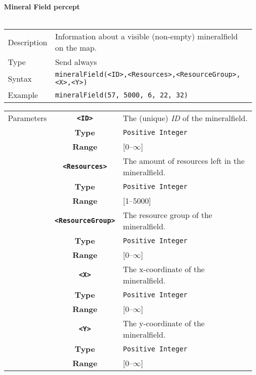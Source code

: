 \newpage
\noindent
\textbf{Mineral Field percept}\\
\\
\begin{tabularx}{\textwidth}{lX}
 Description & Information about a visible (non-empty) mineralfield on the map. \\
 Type & Send always \\
 Syntax & \verb|mineralField(<ID>,<Resources>,<ResourceGroup>,<X>,<Y>)| \\
 Example & \verb|mineralField(57, 5000, 6, 22, 32)| \\
 \end{tabularx}
 \begin{tabularx}{\textwidth}{l | c | p{8cm}|}
 \cline{2-3}
 Parameters & \textbf{\verb|<ID>|} & The (unique) \textit{ID} of the mineralfield.\\
            & \textbf{Type} & \verb|Positive Integer| \\
            & \textbf{Range} & [0--$\infty$] \\
            \cline{2-3}
            & \textbf{\verb|<Resources>|} & The amount of resources left in the mineralfield.\\
            & \textbf{Type} & \verb|Positive Integer| \\
            & \textbf{Range} & [1--5000] \\
            \cline{2-3}
            & \textbf{\verb|<ResourceGroup>|} & The resource group of the mineralfield. \\
            & \textbf{Type} & \verb|Positive Integer| \\
            & \textbf{Range} & [0--$\infty$] \\
            \cline{2-3}
            & \textbf{\verb|<X>|} & The x-coordinate of the mineralfield.\\
            & \textbf{Type} & \verb|Positive Integer| \\
            & \textbf{Range} & [0--$\infty$] \\
            \cline{2-3}
            & \textbf{\verb|<Y>|} & The y-coordinate of the mineralfield.\\
            & \textbf{Type} & \verb|Positive Integer| \\
            & \textbf{Range} & [0--$\infty$] \\
            \cline{2-3}
\end{tabularx} \\

